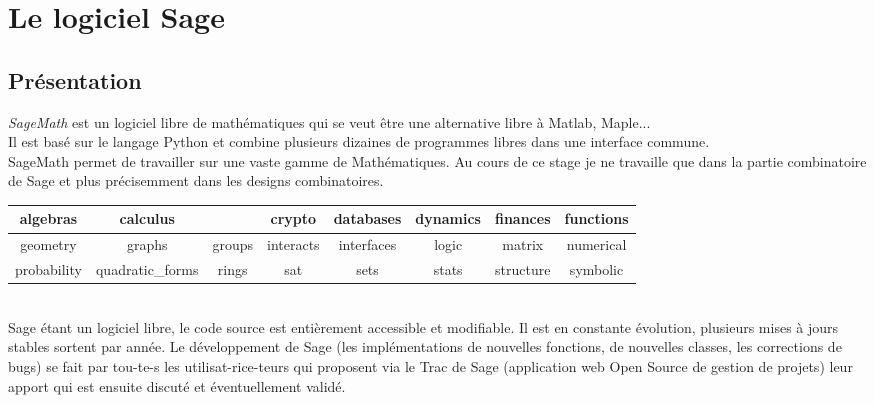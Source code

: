 \documentclass[a4paper]{article}
\begin{document}
\newpage

\section{Le logiciel Sage}
\subsection{Présentation}
\textit{SageMath} est un logiciel libre de mathématiques qui se veut être une alternative libre à Matlab, Maple...\vspace{1\baselineskip}\\

Il est basé sur le langage Python et combine plusieurs dizaines de programmes libres dans une interface commune.\\
SageMath permet de travailler sur une vaste gamme de Mathématiques. Au cours de ce stage je ne travaille que dans la partie combinatoire de Sage et plus précisemment dans les designs combinatoires.
\vspace{1\baselineskip}\\
\begin{tabular}{|c|c|c|c|c|c|c|c|}
  \hline
  algebras & calculus & \cellcolor{red}\color{white}{combinat} & crypto & databases & dynamics & finances & functions\\
  \hline
  geometry & graphs & groups & interacts & interfaces & logic & matrix & numerical\\
  \hline
  probability & quadratic\_forms & rings & sat & sets & stats & structure & symbolic\\
  \hline
\end{tabular}
\vspace{1\baselineskip}\\
Sage étant un logiciel libre, le code source est entièrement accessible et modifiable. Il est en constante évolution, plusieurs mises à jours stables sortent par année. Le développement de Sage (les implémentations de nouvelles fonctions, de nouvelles classes, les corrections de bugs) se fait par tou-te-s les utilisat-rice-teurs qui proposent via le Trac de Sage (application web Open Source de gestion de projets) leur apport qui est ensuite discuté et éventuellement validé.
\end{document}
